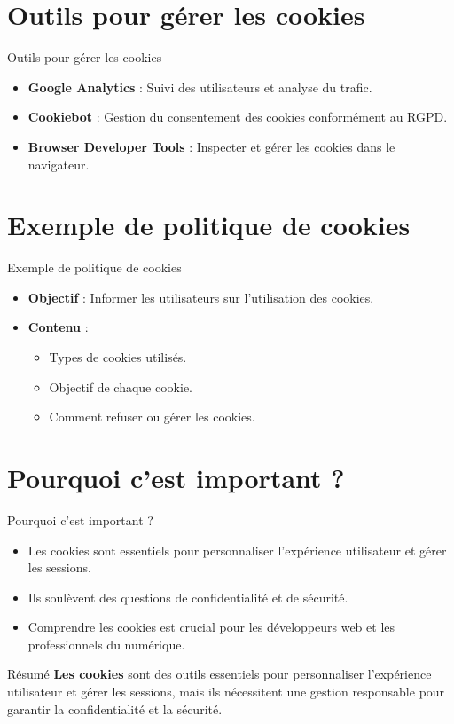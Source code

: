 \documentclass{clbeamer2024}
\begin{document}
\section{Outils pour gérer les cookies}
\begin{frame}{Outils pour gérer les cookies}
	\begin{itemize}
		\item \textbf{Google Analytics} : Suivi des utilisateurs et analyse du trafic.
		\item \textbf{Cookiebot} : Gestion du consentement des cookies conformément au RGPD.
		\item \textbf{Browser Developer Tools} : Inspecter et gérer les cookies dans le navigateur.
	\end{itemize}
\end{frame}


\section{Exemple de politique de cookies}
\begin{frame}{Exemple de politique de cookies}
	\begin{itemize}
		\item \textbf{Objectif} : Informer les utilisateurs sur l'utilisation des cookies.
		\item \textbf{Contenu} :
		\begin{itemize}
			\item Types de cookies utilisés.
			\item Objectif de chaque cookie.
			\item Comment refuser ou gérer les cookies.
		\end{itemize}
	\end{itemize}
\end{frame}

\section{Pourquoi c'est important ?}
\begin{frame}{Pourquoi c'est important ?}
	\begin{itemize}
		\item Les cookies sont essentiels pour personnaliser l'expérience utilisateur et gérer les sessions.
		\item Ils soulèvent des questions de confidentialité et de sécurité.
		\item Comprendre les cookies est crucial pour les développeurs web et les professionnels du numérique.
	\end{itemize}
\end{frame}

\begin{frame}{Résumé}
	\textbf{Les cookies} sont des outils essentiels pour personnaliser l'expérience utilisateur et gérer les sessions, mais ils nécessitent une gestion responsable pour garantir la confidentialité et la sécurité.
\end{frame}



	
	
\end{document}
